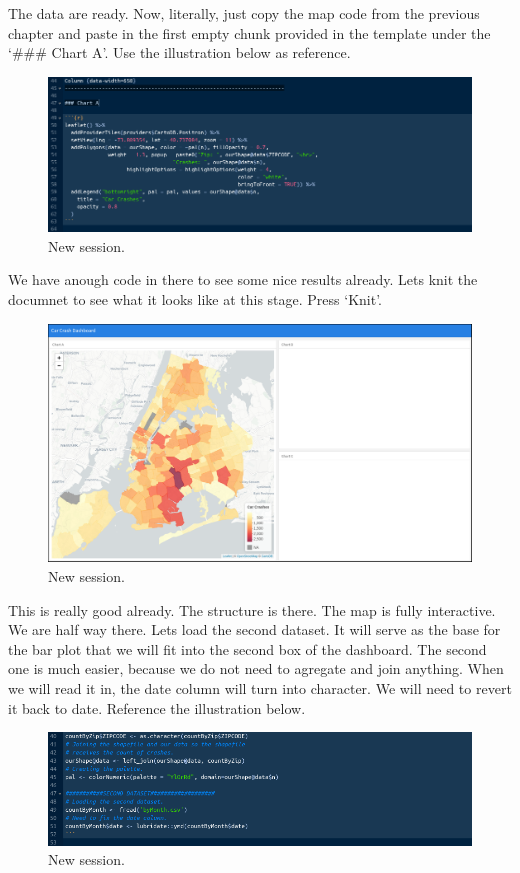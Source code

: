 \documentclass[]{book}
\begin{document}
The data are ready. Now, literally, just copy the map code from the previous chapter and paste in the first empty chunk provided in the template under the `\#\#\# Chart A'. Use the illustration below as reference.

\begin{figure}
\centering
\includegraphics{flex7.png}
\caption{New session.}
\end{figure}

We have anough code in there to see some nice results already. Lets knit the documnet to see what it looks like at this stage. Press `Knit'.

\begin{figure}
\centering
\includegraphics{flex4.png}
\caption{New session.}
\end{figure}

This is really good already. The structure is there. The map is fully interactive. We are half way there. Lets load the second dataset. It will serve as the base for the bar plot that we will fit into the second box of the dashboard. The second one is much easier, because we do not need to agregate and join anything. When we will read it in, the date column will turn into character. We will need to revert it back to date. Reference the illustration below.

\begin{figure}
\centering
\includegraphics{flex8.png}
\caption{New session.}
\end{figure}
\end{document}
